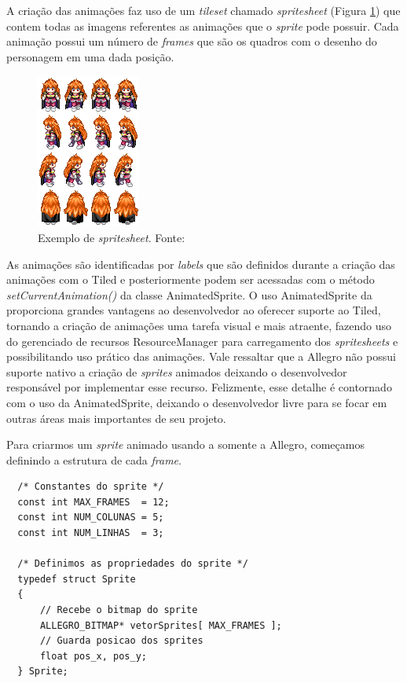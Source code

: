 %
%
A criação das animações faz uso de um \textit{tileset} chamado \textit{spritesheet} (Figura \ref{sprite}) que contem todas as imagens referentes as animações que o \textit{sprite} pode possuir. Cada animação possui um número de \textit{frames} que são os quadros com o desenho do personagem em uma dada posição.
%
%
%
\begin{figure}[H]
    \centering
    \includegraphics[scale = 1]{Imagens/sprite.png}
    \caption{Exemplo de \textit{spritesheet}. Fonte: \cite{Sithjester} }
    \label{sprite}
\end{figure}
%
%
\par 
As animações são identificadas por \textit{labels} que são definidos durante a criação das animações com o Tiled e posteriormente podem ser acessadas com o método \textit{setCurrentAnimation()} da classe AnimatedSprite. O uso AnimatedSprite da proporciona grandes vantagens ao desenvolvedor ao oferecer suporte ao Tiled, tornando a criação de animações uma tarefa visual e mais atraente, fazendo uso do gerenciado de recursos ResourceManager para carregamento dos \textit{spritesheets} e possibilitando uso prático das animações. Vale ressaltar que a Allegro não possui suporte nativo a criação de \textit{sprites} animados deixando o desenvolvedor responsável por implementar esse recurso. Felizmente, esse detalhe é contornado com o uso da AnimatedSprite, deixando o desenvolvedor livre para se focar em outras áreas mais importantes de seu projeto.
%
\par 
Para criarmos um \textit{sprite} animado usando a somente a Allegro, começamos definindo a estrutura de cada \textit{frame}.
%
\begin{lstlisting}
  /* Constantes do sprite */
  const int MAX_FRAMES  = 12;
  const int NUM_COLUNAS = 5;
  const int NUM_LINHAS  = 3;
  
  /* Definimos as propriedades do sprite */
  typedef struct Sprite
  {
      // Recebe o bitmap do sprite
      ALLEGRO_BITMAP* vetorSprites[ MAX_FRAMES ];
      // Guarda posicao dos sprites
      float pos_x, pos_y;
  } Sprite;
\end{lstlisting}
